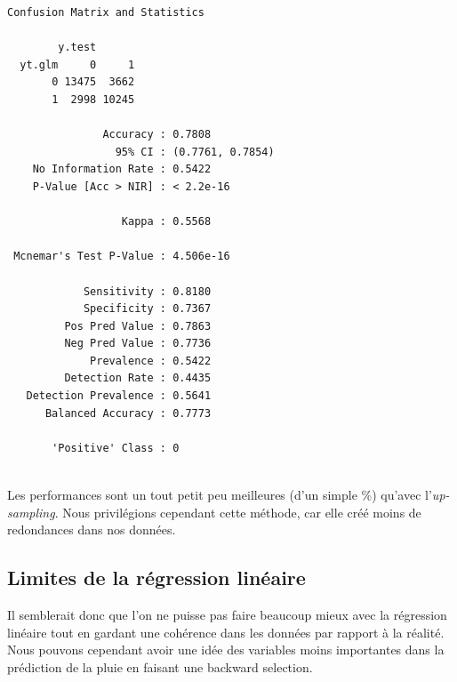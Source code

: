 \documentclass{article}
\begin{document}
    \begin{verbatim}
Confusion Matrix and Statistics
  
        y.test
  yt.glm     0     1
       0 13475  3662
       1  2998 10245
                                          
               Accuracy : 0.7808          
                 95% CI : (0.7761, 0.7854)
    No Information Rate : 0.5422          
    P-Value [Acc > NIR] : < 2.2e-16       
                                          
                  Kappa : 0.5568          
                                          
 Mcnemar's Test P-Value : 4.506e-16       
                                          
            Sensitivity : 0.8180          
            Specificity : 0.7367          
         Pos Pred Value : 0.7863          
         Neg Pred Value : 0.7736          
             Prevalence : 0.5422          
         Detection Rate : 0.4435          
   Detection Prevalence : 0.5641          
      Balanced Accuracy : 0.7773          

       'Positive' Class : 0 
                                 
    \end{verbatim}

Les performances sont un tout petit peu meilleures (d'un simple \%) qu'avec l'\emph{up-sampling}. Nous privilégions cependant cette méthode, car elle créé moins de redondances dans nos données. 

\subsection{Limites de la régression linéaire}

Il semblerait donc que l'on ne puisse pas faire beaucoup mieux avec la régression linéaire tout en gardant une cohérence dans les données par rapport à la réalité. Nous pouvons cependant avoir une idée des variables moins importantes dans la prédiction de la pluie en faisant une backward selection. 
\end{document}
